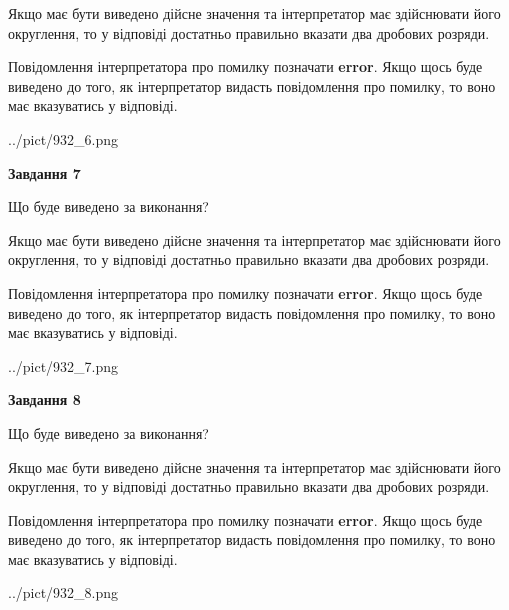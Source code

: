 \documentclass[12pt, ukrainian]{article}
\begin{document}
{\begin {Large}
Якщо має бути виведено дійсне значення та інтерпретатор має здійснювати його округлення, 
то у відповіді достатньо правильно вказати два дробових розряди.

Повідомлення інтерпретатора про помилку позначати \textbf{error}.
Якщо щось буде виведено до того, як інтерпретатор видасть повідомлення про помилку, 
то воно має вказуватись у відповіді. \par

\begin{center}
	{../pict/932_6.png}
\end{center}
\newpage

{\begin {center}\textbf{Завдання 7}\end {center}}\par
Що буде виведено за виконання? \par

Якщо має бути виведено дійсне значення та інтерпретатор має здійснювати його округлення, 
то у відповіді достатньо правильно вказати два дробових розряди.

Повідомлення інтерпретатора про помилку позначати \textbf{error}.
Якщо щось буде виведено до того, як інтерпретатор видасть повідомлення про помилку, 
то воно має вказуватись у відповіді. \par

\begin{center}
	{../pict/932_7.png}
\end{center}
\newpage

{\begin {center}\textbf{Завдання 8}\end {center}}\par
Що буде виведено за виконання? \par

Якщо має бути виведено дійсне значення та інтерпретатор має здійснювати його округлення, 
то у відповіді достатньо правильно вказати два дробових розряди.

Повідомлення інтерпретатора про помилку позначати \textbf{error}.
Якщо щось буде виведено до того, як інтерпретатор видасть повідомлення про помилку, 
то воно має вказуватись у відповіді. \par

\begin{center}
	{../pict/932_8.png}
\end{center}
\newpage


\end{Large}}
\end{document}
